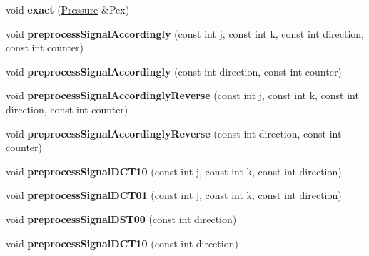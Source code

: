 \begin{DoxyCompactItemize}
\item 
\hypertarget{classFourier_a55b16445add800e6306358b9694c7bd1}{void {\bfseries exact} (\hyperlink{classPressure}{Pressure} \&Pex)}\label{classFourier_a55b16445add800e6306358b9694c7bd1}

\item 
\hypertarget{classFourier_a012bf56395b8df6637d611a407ba2080}{void {\bfseries preprocess\-Signal\-Accordingly} (const int j, const int k, const int direction, const int counter)}\label{classFourier_a012bf56395b8df6637d611a407ba2080}

\item 
\hypertarget{classFourier_a5c3cd85b7b552cac7ff4b41fabf4428b}{void {\bfseries preprocess\-Signal\-Accordingly} (const int direction, const int counter)}\label{classFourier_a5c3cd85b7b552cac7ff4b41fabf4428b}

\item 
\hypertarget{classFourier_addb8e829ef07afae67bcb645eff06e3e}{void {\bfseries preprocess\-Signal\-Accordingly\-Reverse} (const int j, const int k, const int direction, const int counter)}\label{classFourier_addb8e829ef07afae67bcb645eff06e3e}

\item 
\hypertarget{classFourier_a5f4a9a13795cc349d2212dd2f9e220eb}{void {\bfseries preprocess\-Signal\-Accordingly\-Reverse} (const int direction, const int counter)}\label{classFourier_a5f4a9a13795cc349d2212dd2f9e220eb}

\item 
\hypertarget{classFourier_ad3212ed20019097183d341c1cba3ab16}{void {\bfseries preprocess\-Signal\-D\-C\-T10} (const int j, const int k, const int direction)}\label{classFourier_ad3212ed20019097183d341c1cba3ab16}

\item 
\hypertarget{classFourier_a4d3f5a93664335cb671c6f66ca3a5e20}{void {\bfseries preprocess\-Signal\-D\-C\-T01} (const int j, const int k, const int direction)}\label{classFourier_a4d3f5a93664335cb671c6f66ca3a5e20}

\item 
\hypertarget{classFourier_a05da4d167ba9424a8bfde3fd304561b4}{void {\bfseries preprocess\-Signal\-D\-S\-T00} (const int direction)}\label{classFourier_a05da4d167ba9424a8bfde3fd304561b4}

\item 
\hypertarget{classFourier_a3f3da23e3d7813609573d02b16af1e23}{void {\bfseries preprocess\-Signal\-D\-C\-T10} (const int direction)}\label{classFourier_a3f3da23e3d7813609573d02b16af1e23}


\end{DoxyCompactItemize}
